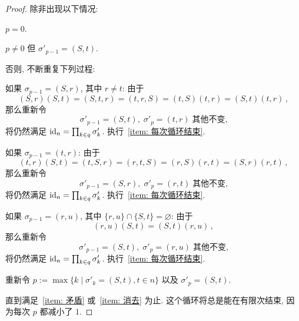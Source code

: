 \documentclass[openany, a5paper, oneside]{ctexbook}
\begin{document}
\begin{proof}
	除非出现以下情况:
	\begin{conditionlist}[label=\alph*)]
		\item $p = 0$. \label{item: 矛盾}
		\item $p \neq 0$ 但 $\sigma'_{p - 1} = (S, t)$. \label{item: 消去}
	\end{conditionlist}
	否则, 不断重复下列过程:
	\begin{conditionlist}[label=\arabic*)]
		\item 如果 $\sigma_{p - 1} = (S, r)$, 其中 $r \neq t$:
			由于
			\begin{equation*}
				(S, r)(S, t) = (S, t, r) = (t, r, S) 
				= (t, S)(t, r) = (S, t)(t, r)\,,
			\end{equation*}
			那么重新令
			\begin{equation*}
				\sigma'_{p - 1} = (S, t),\; 
				\sigma'_p = (t, r)\;
				\text{其他不变,} 
			\end{equation*}
			将仍然满足 $\operatorname{id}_n = \prod_{k \in q} \sigma'_k$. 
			执行~\ref{item: 每次循环结束}. 
		\item 如果 $\sigma_{p - 1} = (t, r)$:
			由于
			\begin{equation*}
				(t, r)(S, t) = (t, S, r) = (r, t, S) 
				= (r, S)(r, t) = (S, r)(r, t)\,,
			\end{equation*}
			那么重新令
			\begin{equation*}
				\sigma'_{p - 1} = (S, r),\; 
				\sigma'_p = (r, t)\;
				\text{其他不变,} 
			\end{equation*}
			将仍然满足 $\operatorname{id}_n = \prod_{k \in q} \sigma'_k$. 
			执行~\ref{item: 每次循环结束}. 
		\item 如果 $\sigma_{p - 1} = (r, u)$, 其中 $\{r, u\} \cap \{S, t\} = \varnothing$:
			由于
			\begin{equation*}
				(r, u)(S, t) = (S, t)(r, u)\,,
			\end{equation*}
			那么重新令
			\begin{equation*}
				\sigma'_{p - 1} = (S, t),\; 
				\sigma'_p = (r, u)\;
				\text{其他不变,} 
			\end{equation*}
			将仍然满足 $\operatorname{id}_n = \prod_{k \in q} \sigma'_k$. 
			执行~\ref{item: 每次循环结束}. 
		\item 重新令 $p := \max\{ k \mid \sigma'_k = (S,t), t\in n\}$ 以及 $\sigma'_p = (S, t)$. \label{item: 每次循环结束}
	\end{conditionlist}
	直到满足~\ref{item: 矛盾} 或~\ref{item: 消去} 为止. 
	这个循环将总是能在有限次结束, 因为每次 $p$ 都减小了 $1$.


\end{proof}
\end{document}
